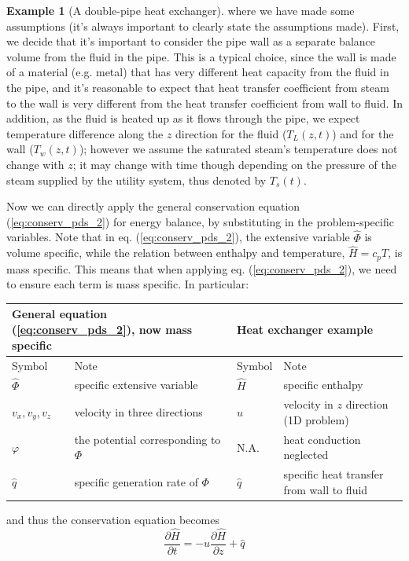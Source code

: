 \documentclass[a4paper,11pt]{article}
\theoremstyle{definition}
\newtheorem{exmp}{Example}[section]
\begin{document}
\begin{exmp}[A double-pipe heat exchanger]
\noindent where we have made some assumptions (it's always important to clearly state the assumptions made).
First, we decide that it's important to consider the pipe wall as a separate balance volume from
the fluid in the pipe. This is a typical choice, since the wall is made of a material (e.g. metal) that has very different
heat capacity from the fluid in the pipe, and it's reasonable to expect that heat transfer coefficient from steam to the wall
is very different from the heat transfer coefficient from wall to fluid. In addition, as the fluid is heated up as it
flows through the pipe, we expect temperature difference along the $z$ direction for the fluid ($T_L(z, t)$)
and for the wall ($T_w(z, t)$); however we assume the saturated steam's temperature does not change with
$z$; it may change with time though depending on the pressure of the steam supplied by the utility system, thus
denoted by $T_s(t)$.

Now we can directly apply the general conservation equation (\ref{eq:conserv_pds_2}) for energy balance,
by substituting in the problem-specific variables. Note that in eq. (\ref{eq:conserv_pds_2}), the extensive
variable $\hat{\Phi}$ is volume specific, while the relation between enthalpy and temperature, 
$\hat{H} = c_p T$, is mass specific. This means that when applying eq. (\ref{eq:conserv_pds_2}),
we need to ensure each term is mass specific. In particular:

\begin{center}
    \begin{tabular}{ l l | l l}
    \hline
    \multicolumn{2}{l|}{General equation (\ref{eq:conserv_pds_2}), now mass specific} &   \multicolumn{2}{l}{Heat exchanger example} \\
    \hline
    Symbol & Note & Symbol & Note \\
    \hline
    $\hat{\Phi}$ & specific extensive variable & $\hat{H}$ & specific enthalpy \\
    $v_x, v_y, v_z$ & velocity in three directions & $u$ & velocity in $z$ direction (1D problem) \\
    $\varphi$ & the potential corresponding to $\Phi$ & N.A. & heat conduction neglected  \\
    $\hat{q}$ & specific generation rate of $\Phi$ & $\hat{q}$ & specific heat transfer from wall to fluid \\
    \hline
    \end{tabular}
\end{center}

\noindent and thus the conservation equation becomes
\begin{equation} \label{eq:heat_exchg_1}
	\frac{\partial \hat{H}}{\partial t} = - u \frac{\partial \hat{H}}{\partial z} + \hat{q}
\end{equation}


\end{exmp}
\end{document}
